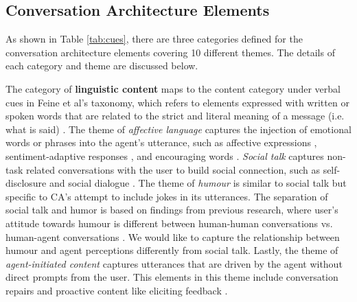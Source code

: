 \documentclass[sigconf,screen,review, anonymous]{acmart}
\newcommand{\cmt}[1]{}%
\begin{document}

\subsection{Conversation Architecture Elements}

As shown in Table \ref{tab:cues}, there are three categories defined for the conversation architecture elements covering 10 different themes. The details of each category and theme are discussed below.

The category of \textbf{linguistic content} maps to the content category under verbal cues in Feine et al's taxonomy, which refers to elements expressed with written or spoken words that are related to the strict and literal meaning of a message (i.e. what is said) \cite{feine2019taxonomy}. The theme of \textit{affective language} captures the injection of emotional words or phrases into the agent's utterance, such as affective expressions \cite{seeger2021chatbots}\cmt{[35]}\cite{yang2017perceived}\cmt{[44]}\cite{zhu2022effects}\cmt{[26]}, sentiment-adaptive responses \cite{diederich2019emulating}\cmt{[25]}, and encouraging words \cite{healey2013relating}\cmt{[39]}. \textit{Social talk} captures non-task related conversations with the user to build social connection, such as self-disclosure \cite{lee2020hear}\cmt{[23]} and social dialogue \cite{volkel2021manipulating}\cmt{[68]}\cite{lubold2016effects}\cmt{[86]}. The theme of \textit{humour} is similar to social talk but specific to CA's attempt to include jokes in its utterances. The separation of social talk and humor is based on findings from previous research, where user's attitude towards humour is different between human-human conversations vs. human-agent conversations \cite{clark2019makes}. We would like to capture the relationship between humour and agent perceptions differently from social talk. Lastly, the theme of \textit{agent-initiated content} captures utterances that are driven by the agent without direct prompts from the user. This elements in this theme include conversation repairs \cite{cuadra2021my}\cmt{[67]}\cite{ashktorab2019resilient}\cmt{[88]} and proactive content like eliciting feedback \cite{xiao2021let}\cmt{[73]}.
\end{document}
